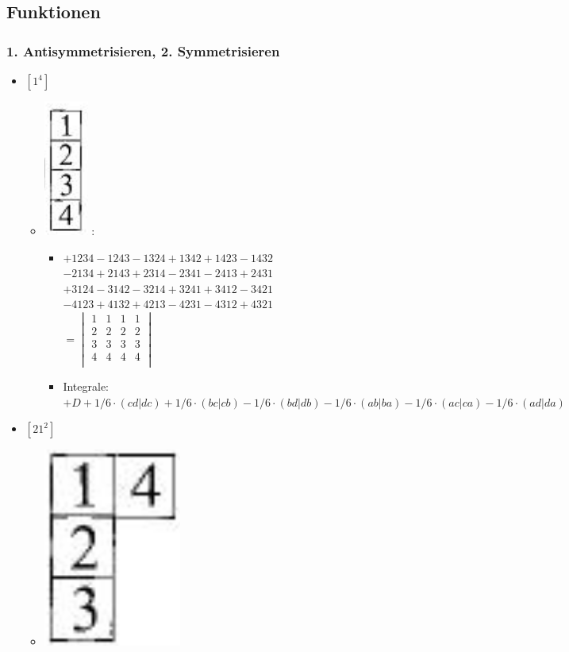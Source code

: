 \documentclass[12pt,a4paper]{article}
\newcommand{\h}[2]{\color{#1} #2 \color{black} }
\newcommand{\equalInM}[1]{\h{blue}{#1}} %
\begin{document}
 \newpage
\subsection{Funktionen}
\subsubsection{1. Antisymmetrisieren, 2. Symmetrisieren}
\begin{itemize}
\item $\left[ 1 ^4\right]$ 
\begin{itemize}
\item \includegraphics[scale=0.4]{build/young-1hoch4.png} :
\begin{itemize}
\item \equalInM{$
+1234-1243-1324+1342
+1423-1432 $\\
$-2134+2143 +2314-2341-2413+2431$\\
$+3124-3142-3214+3241 +3412-3421$\\
$-4123+4132 +4213-4231-4312+4321$ \\
$ = \begin{vmatrix}
1 & 1 & 1 & 1 \\
2 & 2 & 2 & 2 \\
3 & 3 & 3 & 3 \\
4 & 4 & 4 & 4 \\
\end{vmatrix}$}
\item Integrale: \\
$+ D + 1/6 \cdot (cd|dc) + 1/6 \cdot (bc|cb) - 1/6 \cdot (bd|db) - 1/6 \cdot (ab|ba) - 1/6 \cdot (ac|ca) - 1/6 \cdot (ad|da)$
\end{itemize}
\end{itemize}
\item $\left[ 2 1 ^2\right]$
\begin{itemize}
\item \includegraphics[scale=0.2]{build/young-21hoch2-14.png}

\end{itemize}
\end{itemize}
\end{document}
